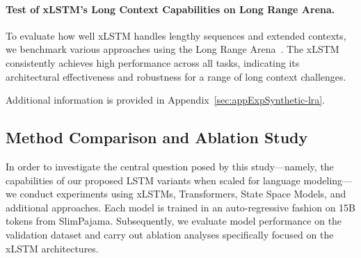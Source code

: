\paragraph{Test of xLSTM's Long Context Capabilities on Long Range Arena.} To evaluate how well xLSTM handles lengthy sequences and extended contexts, we benchmark various approaches using the Long Range Arena~\citep{Tay:21}. The xLSTM consistently achieves high performance across all tasks, indicating its architectural effectiveness and robustness for a range of long context challenges.

Additional information is provided in Appendix~\ref{sec:appExpSynthetic-lra}.

\subsection{Method Comparison and Ablation Study}
\label{sec:ExpComparison}

In order to investigate the central question posed by this study—namely, the capabilities of our proposed LSTM variants when scaled for language modeling—we conduct experiments using xLSTMs, Transformers, State Space Models, and additional approaches. Each model is trained in an auto-regressive fashion on 15B tokens from SlimPajama. Subsequently, we evaluate model performance on the validation dataset and carry out ablation analyses specifically focused on the xLSTM architectures.

